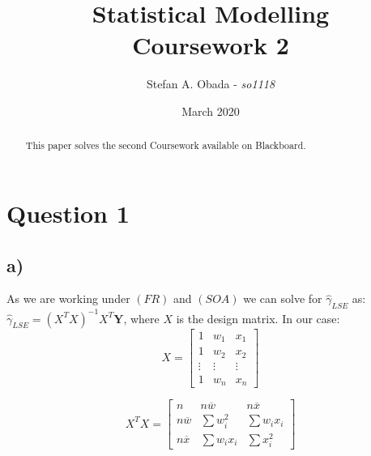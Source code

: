 \documentclass[a4paper]{article}
\title{Statistical Modelling\\
Coursework 2}
\author{Stefan A. Obada - \textit{so1118}}
\date{March 2020}
\begin{document}
\maketitle

\begin{abstract}
	This paper solves the second Coursework available on Blackboard.
\end{abstract}



\newpage

\section*{Question 1}

\subsection*{a)}
As we are working under $(FR)$ and $(SOA)$ we can solve for $\hat{\gamma}_{LSE}$ as: $\hat{\gamma}_{LSE} = (X^{T}X)^{-1}X^{T}\textbf{Y}$, where $X$ is the design matrix. In our case:
\begin{equation*}
X = 
	\begin{bmatrix}
	1 & w_{1} & x_{1} \\
	1 & w_{2} & x_{2} \\
	\vdots  & \vdots  & \vdots \\
	1 & w_{n} & x_{n} 
	\end{bmatrix}
\end{equation*}

\begin{equation*}
X^{T}X = 
	\begin{bmatrix}
	n & n\overline{w} & n\overline{x} \\
	n\overline{w} & \sum{w_{i}^2} & \sum{w_{i}x_{i}} \\
	n\overline{x} & \sum{w_{i}x_{i}} & \sum{x_{i}^2}
	\end{bmatrix}
\end{equation*}
\end{document}
